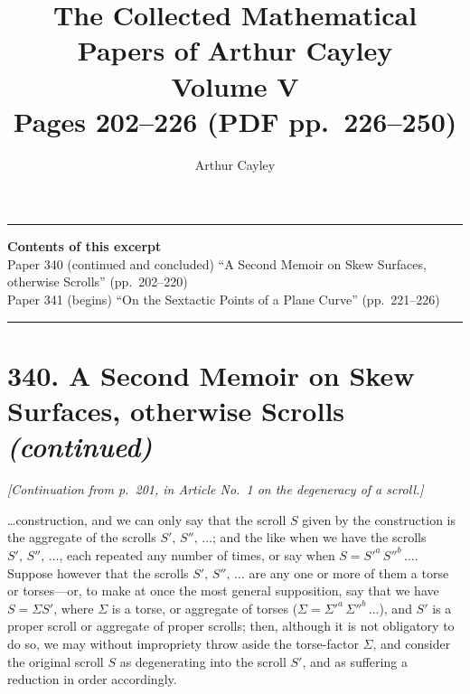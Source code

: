 \documentclass[11pt,a4paper]{article}
\title{\textbf{The Collected Mathematical Papers of Arthur Cayley}\\[6pt]
\Large Volume V\\[12pt]
\large Pages 202--226 \;(PDF pp.\ 226--250)}
\author{Arthur Cayley}
\date{}
\begin{document}
\maketitle
\thispagestyle{empty}

\vspace{1em}
\noindent\rule{\textwidth}{0.4pt}
\vspace{1em}

\begin{center}
\textbf{Contents of this excerpt}\\[4pt]
Paper 340 (continued and concluded) ``A Second Memoir on Skew Surfaces, otherwise Scrolls'' (pp.~202--220)\\
Paper 341 (begins) ``On the Sextactic Points of a Plane Curve'' (pp.~221--226)
\end{center}

\noindent\rule{\textwidth}{0.4pt}
\vspace{1em}

\section*{340. A Second Memoir on Skew Surfaces, otherwise Scrolls \textit{(continued)}}

\noindent\textit{[Continuation from p.~201, in Article No.~1 on the degeneracy of a scroll.]}

\medskip

\noindent\ldots construction, and we can only say that the scroll $S$ given by the construction is the aggregate of the scrolls $S',\,S'',\,\ldots$; and the like when we have the scrolls $S',\,S'',\,\ldots$, each repeated any number of times, or say when $S = S'^a\,S''^b\,\ldots$. Suppose however that the scrolls $S',\,S'',\,\ldots$ are any one or more of them a torse or torses---or, to make at once the most general supposition, say that we have $S = \Sigma S'$, where $\Sigma$ is a torse, or aggregate of torses ($\Sigma = \Sigma'^a\,\Sigma''^b\,\ldots$), and $S'$ is a proper scroll or aggregate of proper scrolls; then, although it is not obligatory to do so, we may without impropriety throw aside the torse-factor $\Sigma$, and consider the original scroll $S$ as degenerating into the scroll $S'$, and as suffering a reduction in order accordingly.

\medskip
\end{document}
